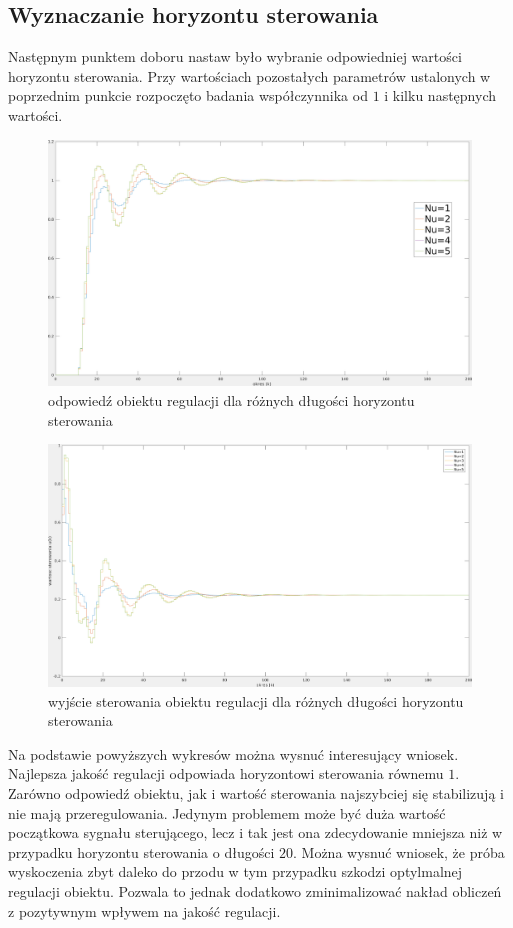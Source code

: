 \documentclass[fleqn]{article}
\begin{document}
\subsection{Wyznaczanie horyzontu sterowania}


Następnym punktem doboru nastaw było wybranie odpowiedniej wartości horyzontu sterowania. Przy wartościach pozostałych parametrów ustalonych w poprzednim punkcie rozpoczęto badania współczynnika od $1$ i kilku następnych wartości.

\begin{figure}[H]
	\includegraphics[width=\textwidth]{scripts/zadanie5cwyjscie2.png}
	\caption{odpowiedź obiektu regulacji dla różnych długości horyzontu sterowania}
\end{figure}
\begin{figure}[H]
	\includegraphics[width=\textwidth]{scripts/zadanie5cster2.png}
	\caption{wyjście sterowania obiektu regulacji dla różnych długości horyzontu sterowania}
\end{figure}

Na podstawie powyższych wykresów można wysnuć interesujący wniosek. Najlepsza jakość regulacji odpowiada horyzontowi sterowania równemu $1$. Zarówno odpowiedź obiektu, jak i wartość sterowania najszybciej się stabilizują i nie mają przeregulowania. Jedynym problemem może być duża wartość początkowa sygnału sterującego, lecz i tak jest ona zdecydowanie mniejsza niż w przypadku horyzontu sterowania o długości $20$. Można wysnuć wniosek, że próba wyskoczenia zbyt daleko do przodu w tym przypadku szkodzi optylmalnej regulacji obiektu. Pozwala to jednak dodatkowo zminimalizować nakład obliczeń z pozytywnym wpływem na jakość regulacji.
\end{document}
